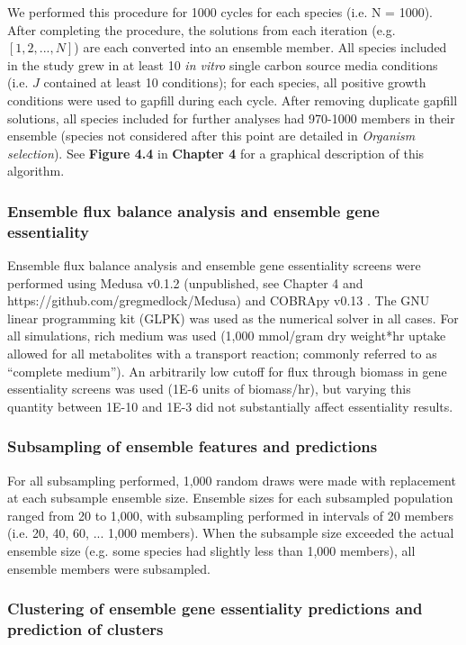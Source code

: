 \documentclass[11pt,onecolumn,notitlepage,openany,twoside]{book}
\begin{document}
\begin{refsection}
We performed this procedure for 1000 cycles for each species (i.e. N = 1000). After completing the procedure, the solutions from each iteration (e.g. $[1,2,...,N]$) are each converted into an ensemble member. All species included in the study grew in at least 10 \textit{in vitro} single carbon source media conditions (i.e. $J$ contained at least 10 conditions); for each species, all positive growth conditions were used to gapfill during each cycle. After removing duplicate gapfill solutions, all species included for further analyses had 970-1000 members in their ensemble (species not considered after this point are detailed in \textit{Organism selection}). See \textbf{Figure 4.4} in \textbf{Chapter 4} for a graphical description of this algorithm.

\subsubsection{Ensemble flux balance analysis and ensemble gene essentiality}

Ensemble flux balance analysis and ensemble gene essentiality screens were performed using Medusa v0.1.2 (unpublished, see Chapter 4 and https://github.com/gregmedlock/Medusa) and COBRApy v0.13 \cite{Ebrahim2013-eb}. The GNU linear programming kit (GLPK) was used as the numerical solver in all cases. For all simulations, rich medium was used (1,000 mmol/gram dry weight*hr uptake allowed for all metabolites with a transport reaction; commonly referred to as “complete medium”). An arbitrarily low cutoff for flux through biomass in gene essentiality screens was used (1E-6 units of biomass/hr), but varying this quantity between 1E-10 and 1E-3 did not substantially affect essentiality results.

\subsubsection{Subsampling of ensemble features and predictions}

For all subsampling performed, 1,000 random draws were made with replacement at each subsample ensemble size. Ensemble sizes for each subsampled population ranged from 20 to 1,000, with subsampling performed in intervals of 20 members (i.e. 20, 40, 60, ... 1,000 members). When the subsample size exceeded the actual ensemble size (e.g. some species had slightly less than 1,000 members), all ensemble members were subsampled.

\subsubsection{Clustering of ensemble gene essentiality predictions and prediction of clusters}


\end{refsection}
\end{document}
